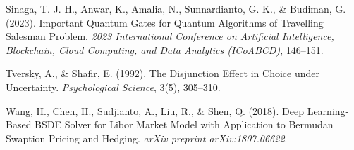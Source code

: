 \begin{thebibliography}{}
Sinaga, T. J. H., Anwar, K., Amalia, N., Sunnardianto, G. K., \& Budiman, G. (2023). Important Quantum Gates for Quantum Algorithms of Travelling Salesman Problem. \textit{2023 International Conference on Artificial Intelligence, Blockchain, Cloud Computing, and Data Analytics (ICoABCD)}, 146--151.

Tversky, A., \& Shafir, E. (1992). The Disjunction Effect in Choice under Uncertainty. \textit{Psychological Science}, 3(5), 305--310.

Wang, H., Chen, H., Sudjianto, A., Liu, R., \& Shen, Q. (2018). Deep Learning-Based BSDE Solver for Libor Market Model with Application to Bermudan Swaption Pricing and Hedging. \textit{arXiv preprint arXiv:1807.06622}.

\end{thebibliography}